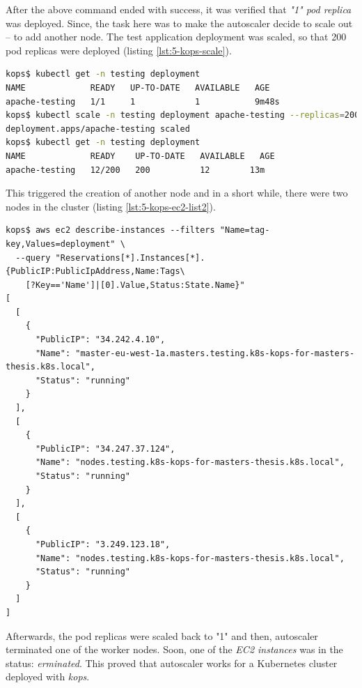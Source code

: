 After the above command ended with success, it was verified that \textit{"1" pod replica} was deployed. Since, the task here was to make the autoscaler decide to scale out -- to add another node. The test application deployment was scaled, so that 200 pod replicas were deployed (listing \ref{lst:5-kops-scale}).
\begin{lstlisting}[basicstyle=\scriptsize,xleftmargin=0cm,label=lst:5-kops-scale,caption={Scaling the test application pod replicas},captionpos=b,language=Bash]
kops$ kubectl get -n testing deployment
NAME             READY   UP-TO-DATE   AVAILABLE   AGE
apache-testing   1/1     1            1           9m48s
kops$ kubectl scale -n testing deployment apache-testing --replicas=200
deployment.apps/apache-testing scaled
kops$ kubectl get -n testing deployment
NAME             READY    UP-TO-DATE   AVAILABLE   AGE
apache-testing   12/200   200          12        13m
\end{lstlisting}

This triggered the creation of another node and in a short while, there were two nodes in the cluster (listing \ref{lst:5-kops-ec2-list2}).
\begin{lstlisting}[basicstyle=\scriptsize,xleftmargin=0cm,label=lst:5-kops-ec2-list2,caption={Listing the \textit{EC2 instances}, 1 of them was created by autoscaler}]
kops$ aws ec2 describe-instances --filters "Name=tag-key,Values=deployment" \
  --query "Reservations[*].Instances[*].{PublicIP:PublicIpAddress,Name:Tags\
    [?Key=='Name']|[0].Value,Status:State.Name}"
[
  [
    {
      "PublicIP": "34.242.4.10",
      "Name": "master-eu-west-1a.masters.testing.k8s-kops-for-masters-thesis.k8s.local",
      "Status": "running"
    }
  ],
  [
    {
      "PublicIP": "34.247.37.124",
      "Name": "nodes.testing.k8s-kops-for-masters-thesis.k8s.local",
      "Status": "running"
    }
  ],
  [
    {
      "PublicIP": "3.249.123.18",
      "Name": "nodes.testing.k8s-kops-for-masters-thesis.k8s.local",
      "Status": "running"
    }
  ]
]
\end{lstlisting}

Afterwards, the pod replicas were scaled back to "1" and then, autoscaler terminated one of the worker nodes. Soon, one of the \textit{EC2 instances} was in the status: \textit{erminated}. This proved that autoscaler works for a Kubernetes cluster deployed with \textit{kops}.

